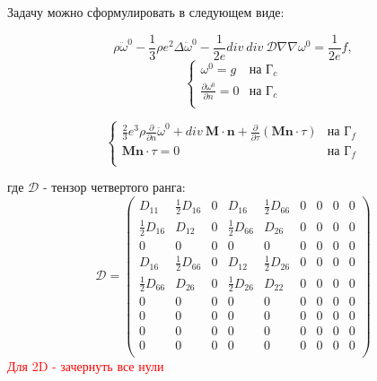 \documentclass[a4paper,12pt]{article}
\begin{document}
Задачу можно сформулировать в следующем виде:

        
\begin{equation}
\rho\ddot{\omega}^0 - \frac{1}{3}\rho e^2\Delta\ddot{\omega}^0 - \frac{1}{2e}div \: div \: \mathcal{D}\nabla \nabla \omega^0 = \frac{1}{2e}f,
\end{equation}
\begin{equation}
\begin{cases}
    \omega^0 = g & \text{на $\text{Г}_c$}  \\
    \frac{\partial\omega^0}{\partial n} = 0 & \text{на $\text{Г}_c$} \\
\end{cases}
\end{equation}

\begin{equation}
\begin{cases}
    \frac{2}{3}e^3\rho \frac{\partial}{\partial n} \ddot{\omega}^0  + div  \: \textbf{M} \cdot \textbf{n} + \frac{\partial}{\partial \tau}(\textbf{Mn} \cdot\tau)& \text{на $\text{Г}_f$} \\
     \textbf{Mn}\cdot \tau= 0 & \text{на $\text{Г}_f$} \\
\end{cases}
\end{equation}

где $\mathcal{D}$ - тензор четвертого ранга:
\begin{equation}
\mathcal{D} = 
\begin{pmatrix}
    D_{11} & \frac{1}{2}D_{16} & 0 &  D_{16} & \frac{1}{2}D_{66} &0 &0 &0 & 0 \\
    \frac{1}{2}D_{16} & D_{12} & 0 & \frac{1}{2}D_{66} & D_{26} & 0 & 0&0 &0 \\
    0&0&0&0&0&0&0&0&0\\
    D_{16} & \frac{1}{2}D_{66} & 0 & D_{12} & \frac{1}{2}D_{26} & 0 &0 &0&0 \\
    \frac{1}{2}D_{66} & D_{26} & 0 & \frac{1}{2}D_{26} & D_{22} & 0 &0 &0&0 \\
    0&0 &0 &0 &0 &0 &0 &0 &0 \\
    0&0 &0 &0 &0 &0 &0 &0 &0 \\
    0&0 &0 &0 &0 &0 &0 &0 &0 \\
    0&0 &0 &0 &0 &0 &0 &0 &0 \\
    
\end{pmatrix}
\end{equation}
\textcolor{red}{ Для 2D - зачернуть все нули}
\end{document}
